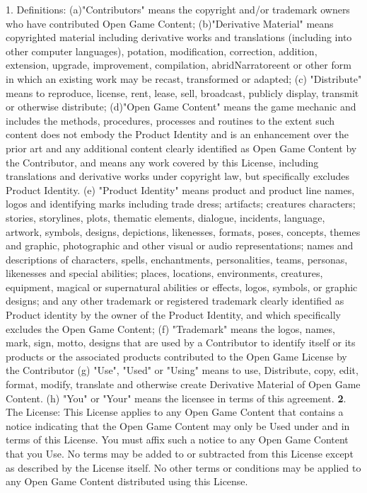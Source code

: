 \documentclass[a4paper,11pt,twoside,openany]{dndbook}
\begin{document}
{{1. Definitions: (a)"Contributors" means the copyright and/or trademark owners who have contributed Open Game Content; (b)"Derivative Material" means copyrighted material including derivative works and translations (including into other computer languages), potation, modification, correction, addition, extension, upgrade, improvement, compilation, abridNarratoreent or other form in which an existing work may be recast, transformed or adapted; (c) "Distribute" means to reproduce, license, rent, lease, sell, broadcast, publicly display, transmit or otherwise distribute; (d)"Open Game Content" means the game mechanic and includes the methods, procedures, processes and routines to the extent such content does not embody the Product Identity and is an enhancement over the prior art and any additional content clearly identified as Open Game Content by the Contributor, and means any work covered by this License, including translations and derivative works under copyright law, but specifically excludes Product Identity. (e) "Product Identity" means product and product line names, logos and identifying marks including trade dress; artifacts; creatures characters; stories, storylines, plots, thematic elements, dialogue, incidents, language, artwork, symbols, designs, depictions, likenesses, formats, poses, concepts, themes and graphic, photographic and other visual or audio representations; names and descriptions of characters, spells, enchantments, personalities, teams, personas, likenesses and special abilities; places, locations, environments, creatures, equipment, magical or supernatural abilities or effects, logos, symbols, or graphic designs; and any other trademark or registered trademark clearly identified as Product identity by the owner of the Product Identity, and which specifically excludes the Open Game Content; (f) "Trademark" means the logos, names, mark, sign, motto, designs that are used by a Contributor to identify itself or its products or the associated products contributed to the Open Game License by the Contributor (g) "Use", "Used" or "Using" means to use, Distribute, copy, edit, format, modify, translate and otherwise create Derivative Material of Open Game Content. (h) "You" or "Your" means the licensee in terms of this agreement.
\textbf{2}. The License: This License applies to any Open Game Content that contains a notice indicating that the Open Game Content may only be Used under and in terms of this License. You must affix such a notice to any Open Game Content that you Use. No terms may be added to or subtracted from this License except as described by the License itself. No other terms or conditions may be applied to any Open Game Content distributed using this License.
}}
\end{document}
